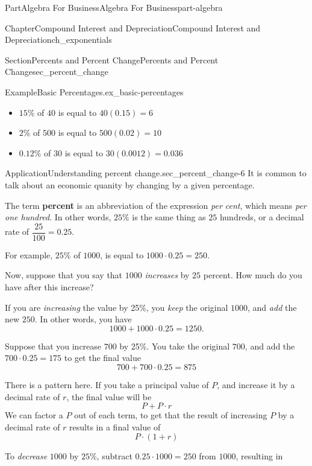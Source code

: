 \documentclass{tufte-book}
\newcommand{\terminology}[1]{\textbf{#1}}
\numberwithin{equation}{chapter}
\begin{document}
\begin{partptx}{Part}{Algebra For Business}{}{Algebra For Business}{}{}{part-algebra}
\begin{chapterptx}{Chapter}{Compound Interest and Depreciation}{}{Compound Interest and Depreciation}{}{}{ch_exponentials}
\begin{sectionptx}{Section}{Percents and Percent Change}{}{Percents and Percent Change}{}{}{sec_percent_change}
\begin{example}{Example}{Basic Percentages.}{ex_basic-percentages}
\begin{itemize}[label=\textbullet]
\item{}\(15\)\% of \textdollar{}\(40\) is equal to \(40 ( 0.15 )= 6\)%
\item{}\(2\)\% of \textdollar{}\(500\) is equal to \(500 (0.02) = 10\)%
\item{}\(0.12\)\% of \textdollar{}\(30\) is equal to \(30 (0.0012) = 0.036\)%
\end{itemize}
%
\end{example}
\begin{insight}{Application}{Understanding percent change.}{sec_percent_change-6}%
It is common to talk about an economic quanity by changing by a  given percentage.%
\par
The term \terminology{percent} is an abbreviation of the expression \emph{per cent}, which means \emph{per one hundred}. In other words, \(25\)\% is the same thing as \(25\) hundreds, or a decimal rate of \(\dfrac{25}{100}=0.25\).%
\par
For example, \(25\)\% of \(1000\), is equal to \(1000\cdot 0.25 = 250\).%
\par
Now, suppose that you say that \(1000\) \emph{increases} by \(25\) percent.  How much do you have after this increase?%
\par
If you are \emph{increasing} the value by 25\%, you \emph{keep} the original \(1000\), and \emph{add} the new \(250\).  In other words, you have%
\begin{equation*}
1000 + 1000\cdot 0.25 = 1250\text{.}
\end{equation*}
%
\par
Suppose that you increase \(700\) by 25\%.  You take the original \(700\), and add the \(700\cdot 0.25=175\) to get the final value%
\begin{equation*}
700 + 700\cdot 0.25 = 875
\end{equation*}
%
\par
There is a pattern here.  If you take a principal value of \(P\), and increase it by a decimal rate of \(r\), the final value will be%
\begin{equation*}
P + P \cdot r 
\end{equation*}
We can factor a \(P\) out of each term, to get that the result of increasing \(P\) by a decimal rate of \(r\) results in a final value of%
\begin{equation*}
P\cdot (1+r)
\end{equation*}
%
\par
To \emph{decrease} \(1000\) by \(25\)\%, subtract \(0.25 \cdot 1000 = 250\) from \(1000\), resulting in%

\end{insight}
\end{sectionptx}
\end{chapterptx}
\end{partptx}
\end{document}
